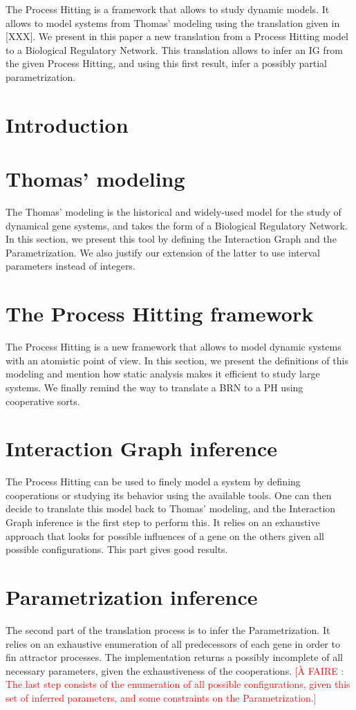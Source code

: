 \documentclass[fleqn]{llncs}
\newcommand{\afaire}[1]{\textcolor{red}{[À FAIRE : #1]}}
\begin{document}
The Process Hitting is a framework that allows to study dynamic models. It allows to model systems from Thomas' modeling using the translation given in [XXX]. We present in this paper a new translation from a Process Hitting model to a Biological Regulatory Network. This translation allows to infer an IG from the given Process Hitting, and using this first result, infer a possibly partial parametrization.

\section{Introduction}

\section{Thomas' modeling}
The Thomas' modeling is the historical and widely-used model for the study of dynamical gene systems, and takes the form of a Biological Regulatory Network. In this section, we present this tool by defining the Interaction Graph and the Parametrization. We also justify our extension of the latter to use interval parameters instead of integers.

\section{The Process Hitting framework}
The Process Hitting is a new framework that allows to model dynamic systems with an atomistic point of view. In this section, we present the definitions of this modeling and mention how static analysis makes it efficient to study large systems. We finally remind the way to translate a BRN to a PH using cooperative sorts.

\section{Interaction Graph inference}
The Process Hitting can be used to finely model a system by defining cooperations or studying its behavior using the available tools. One can then decide to translate this model back to Thomas' modeling, and the Interaction Graph inference is the first step to perform this. It relies on an exhaustive approach that looks for possible influences of a gene on the others given all possible configurations. This part gives good results.

\section{Parametrization inference}
The second part of the translation process is to infer the Parametrization. It relies on an exhaustive enumeration of all predecessors of each gene in order to fin attractor processes. The implementation returns a possibly incomplete of all necessary parameters, given the exhaustiveness of the cooperations. \afaire{The last step consists of the enumeration of all possible configurations, given this set of inferred parameters, and some constraints on the Parametrization.}
\end{document}
